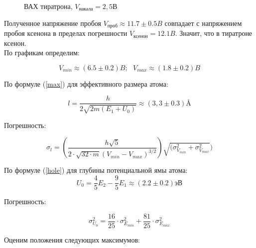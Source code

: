 \documentclass[14pt,a4paper]{scrartcl}
\begin{document}
\begin{figure}[ht!]\label{omega} 
\caption{ВАХ тиратрона, $V_{\text{накала}}=2,5$В}
\end{figure}




\newpage
\newpage

Полученное напряжение пробоя $V_\text{проб} \approx 11.7 \pm 0.5 B$  совпадает с напряжением пробоя ксенона в пределах погрешности $V_\text{ксенон} = 12.1 B$. Значит, что в тиратроне ксенон.\\


По графикам определим:

$$V_{min} \approx (6.5 \pm 0.2) B; \text{ } V_{max} \approx (1.8 \pm 0.2) B$$


По формуле (\ref{max}) для эффективного размера атома:

$$l = \frac{h}{2\sqrt{2m(E_1 + U_0)}} \approx (3,3 \pm 0.3) \text{{\AA}} $$ 

Погрешность:

$$\sigma_l = \left(\frac{h \sqrt{5}}{2\cdot \sqrt{32\cdot m}(V_{min} - V_{max})^{3/2}}\right) \sqrt{ (\sigma^2_{V_{min}} + \sigma^2_{V_{max}}})$$


По формуле (\ref{hole}) для глубины потенциальной ямы атома:
$$U_0 = \frac{4}{5} E_2 - \frac{9}{5} E_1 \approx (2.2 \pm 0.2) \text{эВ}$$
 
Погрешность:


$$
\sigma^2_{U_0} = \frac{16}{25}\cdot \sigma^2_{E_{min}} + \frac{81}{25}\cdot \sigma^2_{E_{max}}
$$



\item Оценим положения следующих максимумов:
\end{document}
